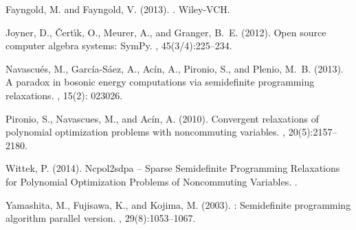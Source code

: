 \documentclass{article}
\begin{document}
\begin{thebibliography}{}

Fayngold, M. and Fayngold, V. (2013).
.
\newblock Wiley-VCH.

Joyner, D., {\v{C}}ert{\'\i}k, O., Meurer, A., and Granger, B.~E. (2012).
\newblock Open source computer algebra systems: {SymPy}.
, 45(3/4):225--234.

Navascu\'es, M., Garc\'ia-S\'aez, A., Ac\'in, A., Pironio, S., and Plenio, M.~B. (2013).
\newblock A paradox in bosonic energy computations via semidefinite programming relaxations.
, 15(2): 023026.

Pironio, S., Navascues, M., and Ac\'in, A. (2010).
\newblock Convergent relaxations of polynomial optimization problems with
  noncommuting variables.
, 20(5):2157--2180.

Wittek, P. (2014). 
\newblock Ncpol2sdpa -- Sparse Semidefinite Programming Relaxations for Polynomial Optimization Problems of Noncommuting Variables. 
.

Yamashita, M., Fujisawa, K., and Kojima, M. (2003).
: Semidefinite programming algorithm parallel version.
, 29(8):1053--1067.

\end{thebibliography}
\end{document}
